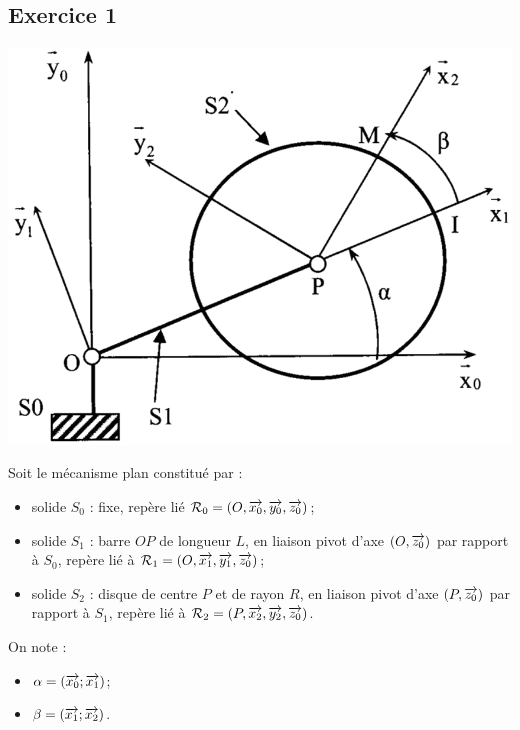 \documentclass[10pt,oneside]{article}
\begin{document}
\subsection*{Exercice 1}
\setcounter{subparagraph}{0}
\begin{minipage}[c]{.55\linewidth}
\begin{center}
\includegraphics[width=.95\textwidth]{png/fig2}
\end{center}
\end{minipage}\hfill
\begin{minipage}[c]{.4\linewidth}
Soit le mécanisme plan constitué par :
\begin{itemize}
\item solide $S_0$ : fixe, repère lié $\mathcal{R}_0=\left( O,\overrightarrow{x_0},\overrightarrow{y_0},\overrightarrow{z_0}\right)$;
\item solide $S_1$ : barre $OP$ de longueur $L$, en liaison pivot d’axe $(O,\overrightarrow{z_0})$ par rapport à $S_0$, repère lié  
à $\mathcal{R}_1=\left( O,\overrightarrow{x_1},\overrightarrow{y_1},\overrightarrow{z_0}\right)$;
\item solide $S_2$ : disque de centre $P$ et de rayon $R$, en liaison pivot d’axe $(P,\overrightarrow{z_0})$ par rapport à $S_1$, repère lié à
$\mathcal{R}_2=\left( P,\overrightarrow{x_2},\overrightarrow{y_2},\overrightarrow{z_0}\right)$.
\end{itemize}
On note :
\begin{itemize}
\item $\alpha = \left(\overrightarrow{x_0};\overrightarrow{x_1}\right)$;
\item $\beta = \left(\overrightarrow{x_1};\overrightarrow{x_2}\right)$.
\end{itemize}

\end{minipage}
\end{document}

